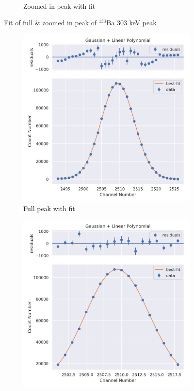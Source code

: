 \documentclass[11pt,a4paper]{article}
\newcommand{\element}[2]{$^{#2}\textrm{#1}$}
\begin{document}
\begin{figure}[H]
\begin{subfigure}{.5\linewidth}
    \caption{Zoomed in peak with fit}
  \end{subfigure}
  \caption{Fit of full \& zoomed in peak of \element{Ba}{133} 303 keV peak}
\end{figure}
\begin{figure}[H]
  \centering
  \begin{subfigure}{.5\linewidth}
    \centering
    \includegraphics[width=\linewidth]{./Images/Barium133/Linear/Linear_6_Full.png}
    \caption{Full peak with fit}
  \end{subfigure}%
  \begin{subfigure}{.5\linewidth}
    \centering
    \includegraphics[width=\linewidth]{./Images/Barium133/Linear/Linear_6_Zoom.png}

\end{subfigure}
\end{figure}
\end{document}
